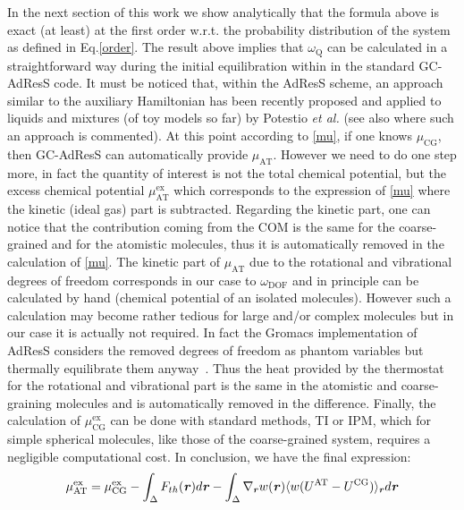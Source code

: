 \documentclass[a4paper,preprint,unsortedaddress]{revtex4-1}
\newcommand{\recheck}[1]{{\color{red} #1}}
\newcommand{\vect}[1]{\textbf{\textit{#1}}}
\newcommand{\dof}{{\textrm{DOF}}}
\newcommand{\AT}{{\textrm{{AT}}}}
\newcommand{\CG}{{\textrm{CG}}}
\newcommand{\exc}{{\textrm{ex}}}
\newcommand{\thermo}{{\textrm{Q}}}
\begin{document}
\recheck{In the next section of this work we show analytically that the formula above is exact (at least) at the first order w.r.t. the probability distribution of the system as defined in Eq.\ref{order}}.
The result above implies that $\omega_{\thermo}$ can be calculated in a straightforward way during the initial equilibration within in the standard GC-AdResS code. 
\recheck{It must be noticed that, within the AdResS scheme, an approach similar to the auxiliary Hamiltonian  has been recently proposed and applied to liquids and mixtures (of toy models so far) by Potestio {\it et al.} \cite{h-adress-0, h-adress} (see also \cite{luigientropy} where such an approach is commented)}. At this point according to \eqref{mu}, if one knows $\mu_{\CG}$, then  GC-AdResS can automatically provide $\mu_{\AT}$. However we need to do one step more, in fact the quantity of interest is not the total chemical potential, but the excess chemical potential $\mu^{\exc}_{\AT}$ which corresponds to the expression of \eqref{mu} where the kinetic (ideal gas) part is subtracted. Regarding the kinetic part, one can notice that the contribution coming from the COM is the same for the coarse-grained and for the atomistic molecules, thus it is automatically removed in the calculation of \eqref{mu}.
The kinetic part of $\mu_{\AT}$ due to the rotational and vibrational degrees of freedom corresponds in our case to $\omega_{\dof}$ and \recheck{in principle can be calculated by hand (chemical potential of an isolated molecules). However such a calculation may become rather tedious for large and/or complex molecules but in our case it is actually not required.} In fact the \recheck{Gromacs implementation of AdResS} considers the removed degrees of freedom as phantom variables but thermally equilibrate them anyway~\cite{simon-ch}. Thus the heat provided by the thermostat for the rotational and vibrational part is the same in the atomistic and coarse-graining molecules and is automatically removed in the difference. Finally, the calculation of $\mu^{\exc}_{\CG}$ can be done with standard methods, TI or IPM, which for simple spherical molecules, like those of the coarse-grained system, requires a negligible computational cost.
In conclusion, we have the final expression:
\begin{equation}
  \mu^{\exc}_{\AT}=
  \mu^{\exc}_{\CG}-
  \int_{\Delta}{F}_{th}({\vect r})d{\vect r}-
  \int_{\Delta}\nabla_{\vect r} w(\vect r) \langle w(U^{\AT}-U^{\CG})\rangle_{\vect r} d{\vect r}
\label{finalmu}
\end{equation}
\end{document}

